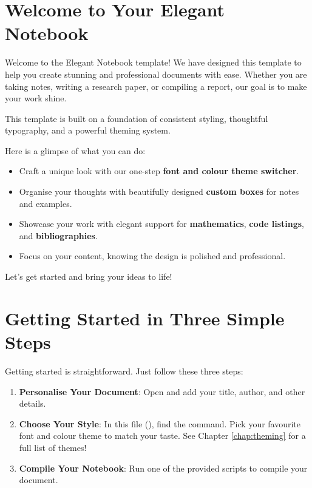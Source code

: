 \documentclass[a4paper,11pt]{report}
\begin{document}


\tableofcontents
\newpage

\chapter{Welcome to Your Elegant Notebook}
Welcome to the Elegant Notebook template! We have designed this template to help you create stunning and professional documents with ease. Whether you are taking notes, writing a research paper, or compiling a report, our goal is to make your work shine.

This template is built on a foundation of consistent styling, thoughtful typography, and a powerful theming system.

\begin{notetbox}
Here is a glimpse of what you can do:
\begin{itemize}
    \item Craft a unique look with our one-step \textbf{font and colour theme switcher}.
    \item Organise your thoughts with beautifully designed \textbf{custom boxes} for notes and examples.
    \item Showcase your work with elegant support for \textbf{mathematics}, \textbf{code listings}, and \textbf{bibliographies}.
    \item Focus on your content, knowing the design is polished and professional.
\end{itemize}
\end{notetbox}

Let's get started and bring your ideas to life!

\chapter{Getting Started in Three Simple Steps}
Getting started is straightforward. Just follow these three steps:

\begin{enumerate}
    \item \textbf{Personalise Your Document}: Open  and add your title, author, and other details.
    \item \textbf{Choose Your Style}: In this file (), find the \inlinecode{\\usetheme} command. Pick your favourite font and colour theme to match your taste. See Chapter \ref{chap:theming} for a full list of themes!
    \item \textbf{Compile Your Notebook}: Run one of the provided scripts to compile your document.
\end{enumerate}
\end{document}
